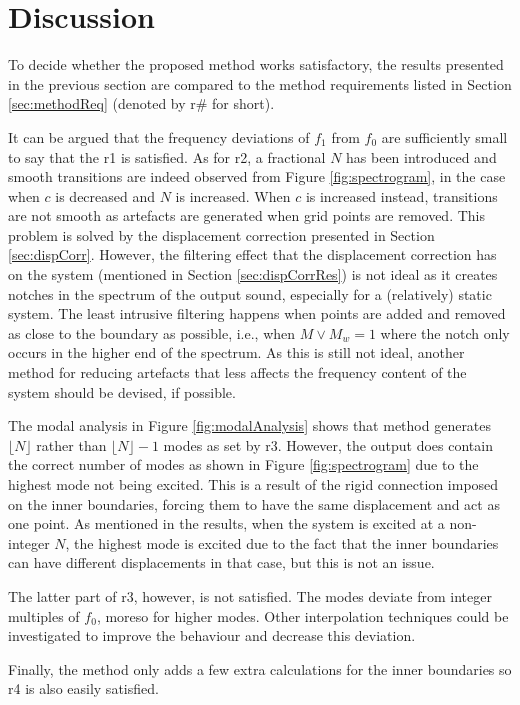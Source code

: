 \section{Discussion}
To decide whether the proposed method works satisfactory, the results presented in the previous section are compared to the method requirements listed in Section \ref{sec:methodReq} (denoted by r\# for short). 

It can be argued that the frequency deviations of $f_1$ from $f_0$ are sufficiently small to say that the r1 is satisfied. As for r2, a fractional $N$ has been introduced and smooth transitions are indeed observed from Figure \ref{fig:spectrogram}, in the case when $c$ is decreased and $N$ is increased. When $c$ is increased instead, transitions are not smooth as artefacts are generated when grid points are removed. This problem is solved by the displacement correction presented in Section \ref{sec:dispCorr}. However, the filtering effect that the displacement correction has on the system (mentioned in Section \ref{sec:dispCorrRes}) is not ideal as it creates notches in the spectrum of the output sound, especially for a (relatively) static system. The least intrusive filtering happens when points are added and removed as close to the boundary as possible, i.e., when $M \vee M_w = 1$ where the notch only occurs in the higher end of the spectrum. As this is still not ideal, another method for reducing artefacts that less affects the frequency content of the system should be devised, if possible. 

The modal analysis in Figure \ref{fig:modalAnalysis} shows that method generates $\lfloor N\rfloor$ rather than $\lfloor N\rfloor - 1$ modes as set by r3. However, the output does contain the correct number of modes as shown in Figure \ref{fig:spectrogram} due to the highest mode not being excited. This is a result of the rigid connection imposed on the inner boundaries, forcing them to have the same displacement and act as one point. As mentioned in the results, when the system is excited at a non-integer $N$, the highest mode is excited due to the fact that the inner boundaries can have different displacements in that case, but this is not an issue.

The latter part of r3, however, is not satisfied. The modes deviate from integer multiples of $f_0$, moreso for higher modes. Other interpolation techniques could be investigated to improve the behaviour and decrease this deviation.

Finally, the method only adds a few extra calculations for the inner boundaries so r4 is also easily satisfied. 
\\


